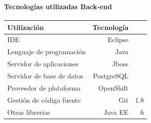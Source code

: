 \begin{frame}
\frametitle{\pagetitle}
\framesubtitle{Tecnologías utilizadas \- Back-end}
\begin{table}
\centering
\begin{tabular}{lrr}
\toprule
\textbf{Utilización} & \textbf{Tecnología}  \\
\midrule
IDE                         & Eclipse \\
Lenguaje de programación    & Java \\
\midrule
Servidor de aplicaciones    & Jboss \\
Servidor de base de datos   & PostgreSQL \\
Proveedor de plataforma     & OpenShift \\
\midrule
Gestión de código fuente    & Git & 1.8\\
Otras librerias             & Java EE & 6\\

\bottomrule
\end{tabular}
\end{table}
\end{frame}
